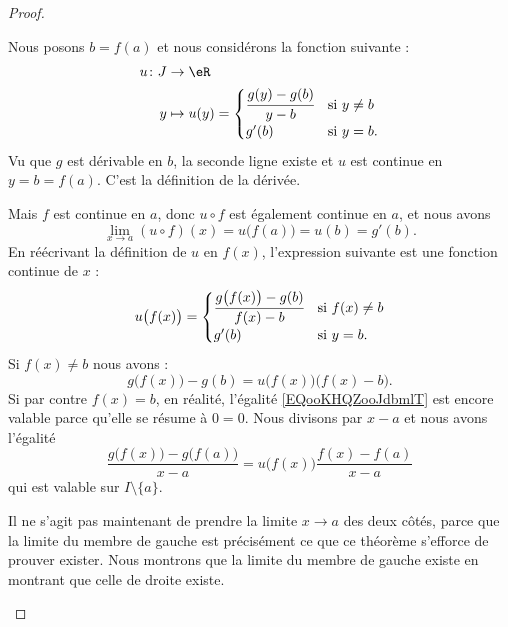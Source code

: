 \begin{proof}
\begin{subproof}
		Nous posons \( b=f(a)\) et nous considérons la fonction suivante :
		\begin{equation}
			\begin{aligned}
				u\colon J & \to \eR                                                      \\
				y         & \mapsto u(y)=\begin{cases}
					                         \cfrac{ g(y)-g(b) }{ y-b } & \text{si } y\neq b \\
					                         g'(b)                      & \text{si } y=b.
				                         \end{cases}
			\end{aligned}
		\end{equation}
		Vu que \( g\) est dérivable en \( b\), la seconde ligne existe et \( u\) est continue en \( y=b=f(a)\). C'est la définition de la dérivée.

		Mais \( f\) est continue en \( a\), donc \( u\circ f\) est également continue en \( a\), et nous avons
		\begin{equation}
			\lim_{x\to a} (u\circ f)(x)=u\big( f(a) \big)=u(b)=g'(b).
		\end{equation}
		En réécrivant la définition de \( u\) en \( f(x)\), l'expression suivante est une fonction continue de \( x\) :
		\begin{equation}
			u\big( f(x) \big)=\begin{cases}
				\cfrac{ g\big( f(x) \big)-g(b) }{ f(x)-b } & \text{si } f(x)\neq b \\
				g'(b)                                      & \text{si } y=b.
			\end{cases}
		\end{equation}
		Si \( f(x)\neq b\) nous avons :
		\begin{equation}        \label{EQooKHQZooJdbmlT}
			g\big( f(x) \big)-g(b)=u\big( f(x) \big)\big( f(x)-b \big).
		\end{equation}
		Si par contre \( f(x)=b\), en réalité, l'égalité \eqref{EQooKHQZooJdbmlT} est encore valable parce qu'elle se résume à \( 0=0\). Nous divisons par \( x-a\) et nous avons l'égalité
		\begin{equation}
			\frac{ g\big( f(x) \big)-g\big( f(a) \big) }{ x-a }=u\big( f(x) \big)\frac{ f(x)-f(a) }{ x-a }
		\end{equation}
		qui est valable sur \( I\setminus\{ a \}\).

		Il ne s'agit pas maintenant de prendre la limite \( x\to a\) des deux côtés, parce que la limite du membre de gauche est précisément ce que ce théorème s'efforce de prouver exister. Nous montrons que la limite du membre de gauche existe en montrant que celle de droite existe.


\end{subproof}
\end{proof}
